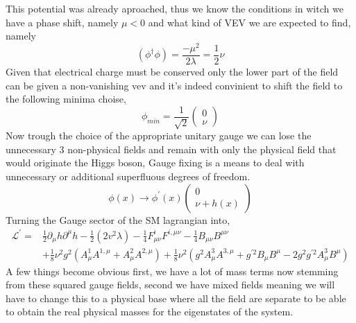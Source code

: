 \documentclass[11pt,twoside,a4paper]{article}
\begin{document}
This potential was already aproached, thus we know the conditions in witch we have a phase shift, namely $\mu < 0$ and what kind of VEV we are expected to find, namely
\begin{equation}
(\phi^\dagger \phi)= \frac{-\mu^2}{2\lambda} = \frac{1}{2} \nu 
\end{equation} 
Given that electrical charge must be conserved only the lower part of the field can be given a non-vanishing vev and it's indeed convinient to shift the field to the following minima choise, 
\begin{equation}
\phi_{min} = \frac{1}{\sqrt{2}} \begin{pmatrix} 0 \\
\nu 
\end{pmatrix}
\end{equation}
Now trough the choice of the appropriate unitary gauge we can lose the unnecessary 3 non-physical fields and remain with only the physical field that would originate the Higgs boson, Gauge fixing is a means to deal with unnecessary or additional superfluous degrees of freedom. 
\begin{equation}
\phi (x) \rightarrow \phi^\prime(x) \begin{pmatrix}
0 \\ 
\nu + h(x) 
\end{pmatrix}
\end{equation}
Turning the Gauge sector of the SM lagrangian into,
\begin{align}
\mathcal{L}^\prime = & \frac{1}{2} \partial_\mu h \partial^\mu h - \frac{1}{2} (2v^2 \lambda)  
 - \frac{1}{4} F^i_{\mu \nu} F^{i , \mu \nu} - \frac{1}{4} B_{\mu \nu} B^{\mu \nu}  \\
& + \frac{1}{8} \nu^2 g^2 (A^1_\mu A^{1,\mu}+ A^2_\mu A^{2,\mu}) +  \frac{1}{8} \nu^2  (g^2  A^3_\mu A^{3,\mu} + g^{\prime 2} B_\mu B^\mu - 2 g^2 g^{\prime 2} A^3_\mu B^\mu )
\end{align}
A few things become obvious first, we have a lot of mass terms now stemming from these squared gauge fields, second we have mixed fields meaning we will have to change this to a physical base where all the field are separate to be able to obtain the real physical masses for the eigenstates of the system. 
\end{document}
